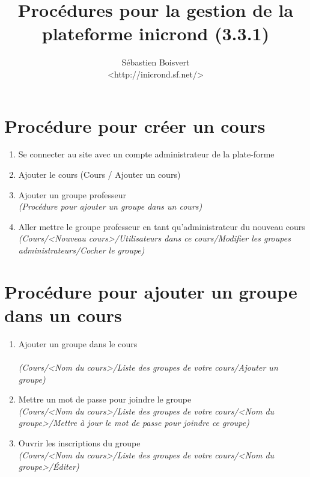 \documentclass[letterpaper]{article}
\begin{document}
\author{Sébastien Boisvert \\ <http://inicrond.sf.net/>}
\title{Procédures pour la gestion de la plateforme inicrond (3.3.1)}

\maketitle

\section{Procédure pour créer un cours}

\begin{enumerate}

\item Se connecter au site avec un compte administrateur de la plate-forme
\item Ajouter le cours (Cours / Ajouter un cours)
\item Ajouter un groupe professeur
    \\ \emph{(Procédure pour ajouter un groupe dans un cours)}
\item Aller mettre le groupe professeur en tant qu'administrateur du nouveau cours
    \\ \emph{(Cours/<Nouveau cours>/Utilisateurs dans ce cours/Modifier les groupes administrateurs/Cocher le groupe)}

\end{enumerate}

\section{Procédure pour ajouter un groupe dans un cours}
\begin{enumerate}
\item Ajouter un groupe dans le cours \\
    \\ \emph{(Cours/<Nom du cours>/Liste des groupes de votre cours/Ajouter un groupe)}
\item Mettre un mot de passe pour joindre le groupe
    \\ \emph{(Cours/<Nom du cours>/Liste des groupes de votre cours/<Nom du groupe>/Mettre à jour le mot de passe pour joindre ce groupe)}
\item Ouvrir les inscriptions du groupe
    \\ \emph{(Cours/<Nom du cours>/Liste des groupes de votre cours/<Nom du groupe>/Éditer)}
\end{enumerate}
\end{document}
